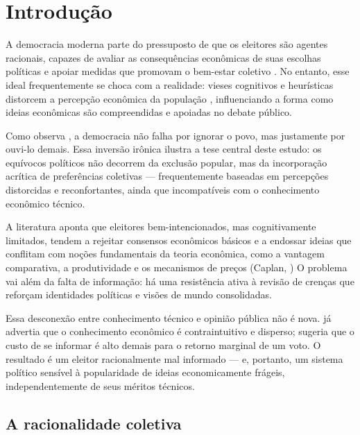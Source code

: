 

\chapter{Introdução} %

A democracia moderna parte do pressuposto de que os eleitores são agentes racionais, capazes de avaliar as consequências econômicas de suas escolhas políticas e apoiar medidas que promovam o bem-estar coletivo \cite{downs1957economic}. No entanto, esse ideal frequentemente se choca com a realidade: vieses cognitivos e heurísticas distorcem a percepção econômica da população \cite{The_Myth_of_the_Rational_Voter,kahneman2011thinking}, influenciando a forma como ideias econômicas são compreendidas e apoiadas no debate público.

Como observa , a democracia não falha por ignorar o povo, mas justamente por ouvi-lo demais. Essa inversão irônica ilustra a tese central deste estudo: os equívocos políticos não decorrem da exclusão popular, mas da incorporação acrítica de preferências coletivas — frequentemente baseadas em percepções distorcidas e reconfortantes, ainda que incompatíveis com o conhecimento econômico técnico.

A literatura aponta que eleitores bem-intencionados, mas cognitivamente limitados, tendem a rejeitar consensos econômicos básicos e a endossar ideias que conflitam com noções fundamentais da teoria econômica, como a vantagem comparativa, a produtividade e os mecanismos de preços (Caplan, \citeyear{Systematically_Biased_Beliefs_about_Economics,The_Myth_of_the_Rational_Voter}) O problema vai além da falta de informação: há uma resistência ativa à revisão de crenças que reforçam identidades políticas e visões de mundo consolidadas.

Essa desconexão entre conhecimento técnico e opinião pública não é nova.  já advertia que o conhecimento econômico é contraintuitivo e disperso;  sugeria que o custo de se informar é alto demais para o retorno marginal de um voto. O resultado é um eleitor racionalmente mal informado — e, portanto, um sistema político sensível à popularidade de ideias economicamente frágeis, independentemente de seus méritos técnicos.

\section{A racionalidade coletiva} %

